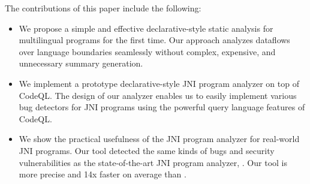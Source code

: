 The contributions of this paper include the following:
\begin{itemize}
  \item We propose a simple and effective declarative-style static analysis for
    multilingual programs for the first time. Our approach analyzes dataflows
    over language boundaries seamlessly without complex, expensive,
    and unnecessary summary generation.

\item We implement a prototype declarative-style JNI program analyzer on top of CodeQL.
  The design of our analyzer enables us to easily implement various bug
    detectors for JNI programs using the powerful query language
    features of CodeQL. 

\item We show the practical usefulness of the JNI program analyzer for real-world
  JNI programs. Our tool detected the same kinds of bugs and security
    vulnerabilities as the state-of-the-art JNI program analyzer, \jnsaf.
Our tool is more precise and 14x faster on average than \jnsaf.
\end{itemize}
